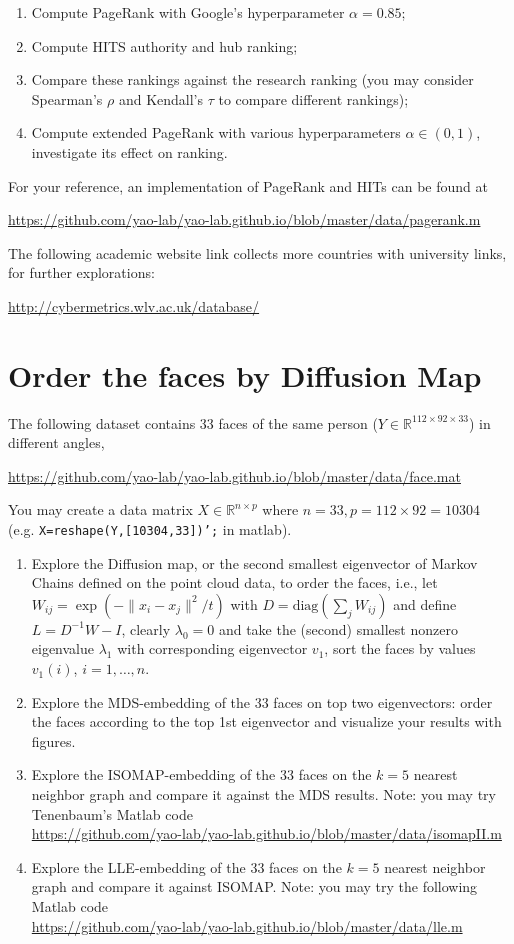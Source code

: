 \documentclass[11pt]{article}
\def\R{{\mathbb R}}
\def\diag{{\mathrm{diag}}}
\begin{document}
\begin{enumerate}
\item Compute PageRank with Google's hyperparameter $\alpha=0.85$;
\item Compute HITS authority and hub ranking; 
\item Compare these rankings against the research ranking (you may consider Spearman's $\rho$ and Kendall's $\tau$ to compare different rankings);  
\item Compute extended PageRank with various hyperparameters $\alpha\in (0,1)$, investigate its effect on ranking. 
\end{enumerate} 

For your reference, an implementation of PageRank and HITs can be found at 

\url{https://github.com/yao-lab/yao-lab.github.io/blob/master/data/pagerank.m}

The following academic website link collects more countries with university links, for further explorations:

\url{http://cybermetrics.wlv.ac.uk/database/} 


\section{Order the faces by Diffusion Map}
The following dataset contains 33 faces of the same person ($Y\in \R^{112\times 92\times33}$) in different angles,

\url{https://github.com/yao-lab/yao-lab.github.io/blob/master/data/face.mat}

You may create a data matrix $X\in \R^{n\times p}$ where $n=33,p=112\times92=10304$ \\ (e.g. {\texttt{X=reshape(Y,[10304,33])';}} in matlab).

\begin{enumerate}
\item Explore the Diffusion map, or the second smallest eigenvector of Markov Chains defined on the point cloud data, to order the faces, i.e., let $W_{ij}=\exp(-\|x_i - x_j\|^2/t)$ with $D=\diag(\sum_j W_{ij})$ and define $L=D^{-1} W - I$, clearly $\lambda_0=0$ and take the (second) smallest nonzero eigenvalue $\lambda_1$ with corresponding eigenvector $v_1$, sort the faces by values $v_1(i)$, $i=1,\ldots,n$.  
\item Explore the MDS-embedding of the 33 faces on top two eigenvectors: order the faces according to the top 1st eigenvector and visualize your results with figures. 
\item Explore the ISOMAP-embedding of the 33 faces on the $k=5$ nearest neighbor graph and compare it against the MDS results. Note: you may try Tenenbaum's Matlab code \\
{\url{https://github.com/yao-lab/yao-lab.github.io/blob/master/data/isomapII.m}}
\item Explore the LLE-embedding of the 33 faces on the $k=5$ nearest neighbor graph and compare it against ISOMAP. Note: you may try the following Matlab code \\
{\url{https://github.com/yao-lab/yao-lab.github.io/blob/master/data/lle.m}}
\end{enumerate}
\end{document}
